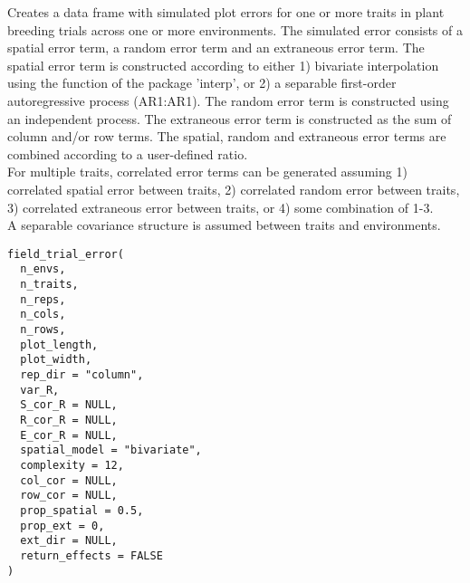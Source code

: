 \documentclass[a4paper]{book}
\begin{document}
%
\begin{Description}\relax
Creates a data frame with simulated plot errors for one or more traits in plant breeding
trials across one or more environments. The simulated error consists of a spatial error term,
a random error term and an extraneous error term. The spatial error term is constructed
according to either 1) bivariate interpolation using the  function of
the package 'interp', or 2) a separable first-order autoregressive process (AR1:AR1). The
random error term is constructed using an independent process. The extraneous error term is
constructed as the sum of column and/or row terms.
The spatial, random and extraneous error terms are combined according to a user-defined ratio.
\\{}
For multiple traits, correlated error terms can be generated assuming 1) correlated spatial
error between traits, 2) correlated random error between traits, 3) correlated extraneous
error between traits, or 4) some combination of 1-3. \\{}
A separable covariance structure is assumed between traits and environments.
\end{Description}
%
\begin{Usage}
\begin{verbatim}
field_trial_error(
  n_envs,
  n_traits,
  n_reps,
  n_cols,
  n_rows,
  plot_length,
  plot_width,
  rep_dir = "column",
  var_R,
  S_cor_R = NULL,
  R_cor_R = NULL,
  E_cor_R = NULL,
  spatial_model = "bivariate",
  complexity = 12,
  col_cor = NULL,
  row_cor = NULL,
  prop_spatial = 0.5,
  prop_ext = 0,
  ext_dir = NULL,
  return_effects = FALSE
)
\end{verbatim}
\end{Usage}
%
\end{document}
